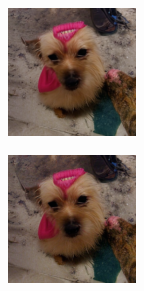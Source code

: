 \documentclass{article}
\begin{document}
\begin{figure}
\begin{subfigure}[b]{0.5\linewidth}
\begin{subfigure}[b]{0.242\linewidth}
        \end{subfigure}
        \begin{subfigure}[b]{0.242\linewidth}
        \includegraphics[width=\linewidth]{figures/imagenet128/solver_samples/imagenet128_fm_ot_355_20.png}
        \end{subfigure}
        \begin{subfigure}[b]{0.242\linewidth}
        \includegraphics[width=\linewidth]{figures/imagenet128/solver_samples/imagenet128_fm_ot_355_50.png}
        \end{subfigure}
    \end{subfigure}\\
    

\end{figure}
\end{document}
